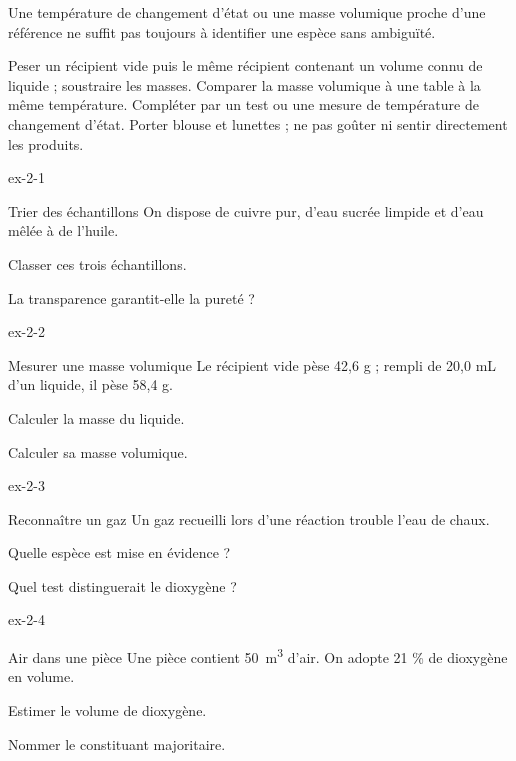 Une température de changement d'état ou une masse volumique proche d'une référence ne suffit pas toujours à identifier une espèce sans ambiguïté.
\begin{experience}Peser un récipient vide puis le même récipient contenant un volume connu de liquide ; soustraire les masses. Comparer la masse volumique à une table à la même température. Compléter par un test ou une mesure de température de changement d'état. Porter blouse et lunettes ; ne pas goûter ni sentir directement les produits.\end{experience}
\exercices
{}
\begin{blocLivre}{ex-2-1}\begin{exercice}[1]{Trier des échantillons}
On dispose de cuivre pur, d’eau sucrée limpide et d’eau mêlée à de l’huile.
\begin{questions}
\item Classer ces trois échantillons.
\item La transparence garantit-elle la pureté ?
\end{questions}
\end{exercice}\end{blocLivre}
\begin{blocLivre}{ex-2-2}\begin{exercice}[1]{Mesurer une masse volumique}
Le récipient vide pèse 42,6 g ; rempli de 20,0 mL d’un liquide, il pèse 58,4 g.
\begin{questions}
\item Calculer la masse du liquide.
\item Calculer sa masse volumique.
\end{questions}
\end{exercice}\end{blocLivre}
\begin{blocLivre}{ex-2-3}\begin{exercice}[1]{Reconnaître un gaz}
Un gaz recueilli lors d’une réaction trouble l’eau de chaux.
\begin{questions}
\item Quelle espèce est mise en évidence ?
\item Quel test distinguerait le dioxygène ?
\end{questions}
\end{exercice}\end{blocLivre}
\begin{blocLivre}{ex-2-4}\begin{exercice}[1]{Air dans une pièce}
Une pièce contient \qty{50}{m^3} d’air. On adopte 21 \% de dioxygène en volume.
\begin{questions}
\item Estimer le volume de dioxygène.
\item Nommer le constituant majoritaire.
\end{questions}
\end{exercice}\end{blocLivre}
